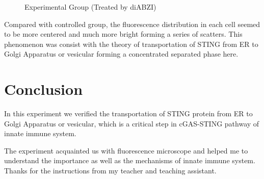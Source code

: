 \documentclass[UTF-8]{article}
\begin{document}
\begin{figure}[h]
    \centering
    \caption{Experimental Group (Treated by diABZI)}  
    \label{Experimental group}
 \end{figure}

 Compared with controlled group, the fluorescence distribution in each cell seemed to be more centered and much more bright forming a series of scatters.
 This phenomenon was consist with the theory of transportation of STING from ER to Golgi Apparatus or vesicular forming a concentrated separated phase here.

\section{Conclusion}
In this experiment we verified the transportation of STING protein from ER to Golgi Apparatus or vesicular, which is a critical step in cGAS-STING pathway of innate immune system.

The experiment acquainted us with fluorescence microscope and helped me to understand the importance as well as the mechanisms of innate immune system.
Thanks for the instructions from my teacher and teaching assistant.



\end{document}
